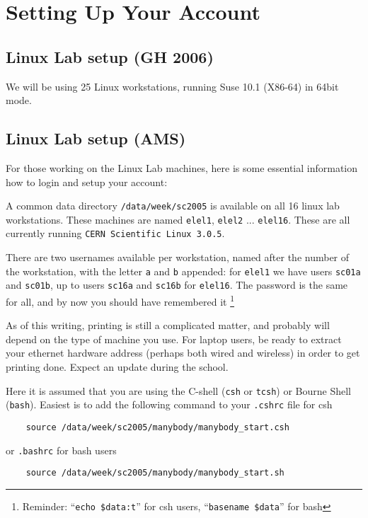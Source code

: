 \chapter                {Setting Up Your Account}

\section{Linux Lab setup (GH 2006)}

We will be using 25 Linux workstations, running Suse 10.1 (X86-64) in 64bit mode.

\section{Linux Lab setup (AMS)}

For those working on the Linux Lab machines, here is some essential 
information how to login and setup your account:

A common data directory {\tt /data/week/sc2005} is available on all 16
linux lab workstations. These machines are 
named {\tt elel1}, {\tt elel2} ... {\tt elel16}. 
These are all currently running {\tt CERN Scientific Linux 3.0.5}.

There are two usernames available per workstation, named after the number
of the workstation, with the letter {\tt a} and {\tt b} appended:
for {\tt elel1} we have users {\tt sc01a} and {\tt sc01b},
up to 
users {\tt sc16a} and {\tt sc16b} for {\tt elel16}. The password is
the same for all, and by now you should have remembered it
\footnote{Reminder: ``{\tt echo \$data:t}'' for csh users, ``{\tt basename \$data}''
for bash}

As of this writing, printing is still a complicated matter, and probably 
will depend on the type
of machine you use. For laptop users, be ready to extract your ethernet hardware
address (perhaps both wired and wireless) in order to get printing done.
Expect an update during the school.

Here it is assumed that you are using 
the C-shell ({\tt csh} or {\tt tcsh}) or Bourne Shell  ({\tt bash}).
Easiest is to add the following  command to your {\tt .cshrc} file
for csh

\begin{verbatim}
    source /data/week/sc2005/manybody/manybody_start.csh
\end{verbatim}
or {\tt .bashrc} for bash users
\begin{verbatim}
    source /data/week/sc2005/manybody/manybody_start.sh
\end{verbatim}

